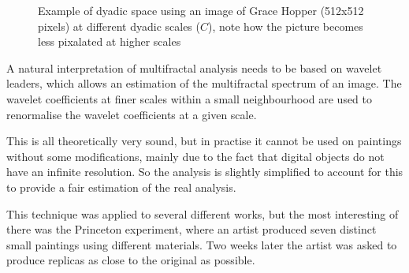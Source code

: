 \documentclass[conference]{IEEEtran}
\begin{document}
\begin{figure}[ht]
\centering
{}%
\hspace{.2in}%
%
\hspace{.2in}%
%
\hspace{.2in}%
%
\caption{Example of dyadic space using an image of Grace Hopper (512x512
pixels) at different dyadic scales ($C$), note how the picture becomes less
pixalated at higher scales}
\label{fig:dyadic-image}
\end{figure}

A natural interpretation of multifractal analysis needs to be based on wavelet
leaders, which allows an estimation of the multifractal spectrum of an image.
The wavelet coefficients at finer scales within a small neighbourhood are used
to renormalise the wavelet coefficients at a given scale.

This is all theoretically very sound, but in practise it cannot be used on
paintings without some modifications, mainly due to the fact that digital
objects do not have an infinite resolution. So the analysis is slightly
simplified to account for this to provide a fair estimation of the real
analysis.

This technique was applied to several different works, but the most interesting
of there was the Princeton experiment, where an artist produced seven distinct
small paintings using different materials. Two weeks later the artist was asked
to produce replicas as close to the original as possible.
\end{document}
